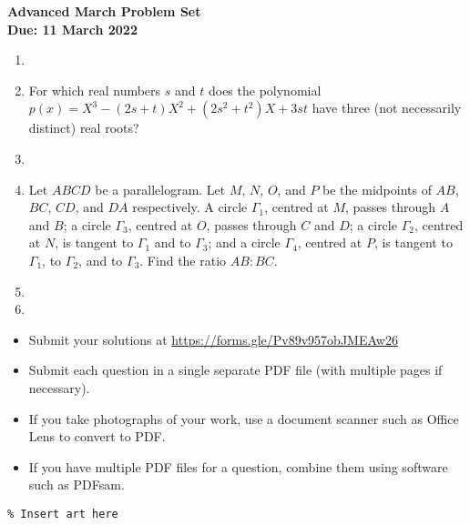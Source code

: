 \documentclass{article}
\begin{document}
\thispagestyle{empty}

\begin{center}
  \textbf{\Large Advanced March Problem Set}
  \\ \vspace{1em}
  \textbf{\large Due: 11 March 2022}
\end{center}

\bigskip

\begin{enumerate}[itemsep=\fill]

\item %


\item %
For which real numbers $s$ and $t$ does the polynomial $p(x) = X^3 -(2s+t)X^2 +(2s^2+t^2)X +3st$ have three (not necessarily distinct) real roots?


\item %


\item %
Let $ABCD$ be a parallelogram.
Let $M$, $N$, $O$, and $P$ be the midpoints of $AB$, $BC$, $CD$, and $DA$ respectively.
A circle $\Gamma_1$, centred at $M$, passes through $A$ and $B$; a circle $\Gamma_3$, centred at $O$, passes through $C$ and $D$; a circle $\Gamma_2$, centred at $N$, is tangent to $\Gamma_1$ and to $\Gamma_3$; and a circle $\Gamma_4$, centred at $P$, is tangent to $\Gamma_1$, to $\Gamma_2$, and to $\Gamma_3$.
Find the ratio $AB:BC$.


\item %


\item %

\end{enumerate}


\vfill
\small
\begin{itemize}
	\item Submit your solutions at \href{https://forms.gle/Pv89v957obJMEAw26}{https://forms.gle/Pv89v957obJMEAw26}
	\item Submit each question in a single separate PDF file (with multiple pages if necessary).
	\item If you take photographs of your work, use a document scanner such as Office Lens to convert to PDF.
	\item If you have multiple PDF files for a question, combine them using software such as PDFsam.
\end{itemize}

\vfill
\centering
\small
\begin{BVerbatim}
\end{BVerbatim}
\end{document}
